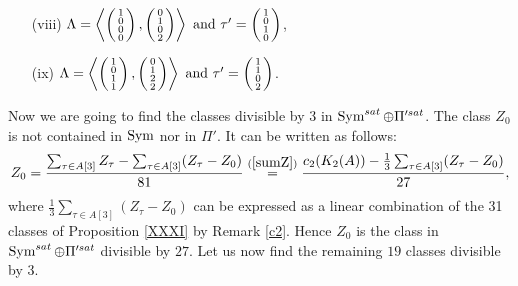 \begin{prop}
\begin{itemize}
\item[(viii)]
$\Lambda=\left< \left( \begin{smallmatrix}  1\\0\\0\\0  \end{smallmatrix} \right), \left( \begin{smallmatrix}  0\\1\\0\\2  \end{smallmatrix} \right) \right> \text{ and } \tau' = \left( \begin{smallmatrix} 1\\0\\1\\0 \end{smallmatrix} \right)$,

\item[(ix)]
$\Lambda=\left< \left( \begin{smallmatrix}  1\\0\\1\\1  \end{smallmatrix} \right), \left( \begin{smallmatrix}  0\\1\\2\\2  \end{smallmatrix} \right) \right> \text{ and } \tau' = \left( \begin{smallmatrix} 1\\1\\0\\2 \end{smallmatrix} \right)$.
\end{itemize}
\end{prop}

Now we are going to find the classes divisible by 3 in $\operatorname{Sym}^{sat}\oplus \Pi'^{sat}$.
The class $Z_0$ is not contained in $\operatorname{Sym}$ nor in $\Pi'$.
It can be written as follows:
$$
Z_0=\frac{\sum_{\tau\in A[3]}Z_\tau-\sum_{\tau\in A[3]}(Z_\tau-Z_0)}{81}
\stackrel{(\ref{sumZ})}{=} \frac{c_2(K_2(A))-\frac{1}{3}\sum_{\tau\in A[3]}(Z_\tau-Z_0)}{27},
$$
where $\frac{1}{3}\sum_{\tau\in A[3]}(Z_\tau-Z_0)$ can be expressed as a linear combination of the 31 classes of Proposition \ref{XXXI} by Remark \ref{c2}.
Hence $Z_0$ is the class in $\operatorname{Sym}^{sat}\oplus \Pi'^{sat}$ divisible by $27$. 
Let us now find the remaining $19$ classes divisible by $3$.


